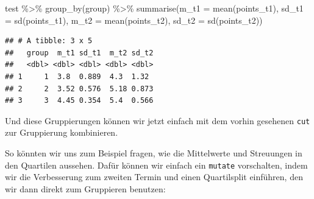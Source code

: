 \documentclass[
]{book}
\newenvironment{Shaded}{\begin{snugshade}}{\end{snugshade}}
\newcommand{\AttributeTok}[1]{\textcolor[rgb]{0.77,0.63,0.00}{#1}}
\newcommand{\FunctionTok}[1]{\textcolor[rgb]{0.00,0.00,0.00}{#1}}
\newcommand{\NormalTok}[1]{#1}
\newcommand{\SpecialCharTok}[1]{\textcolor[rgb]{0.00,0.00,0.00}{#1}}
\begin{document}
\begin{Shaded}
\begin{Highlighting}[]
\NormalTok{test }\SpecialCharTok{\%\textgreater{}\%}
  \FunctionTok{group\_by}\NormalTok{(group) }\SpecialCharTok{\%\textgreater{}\%} 
  \FunctionTok{summarise}\NormalTok{(}\AttributeTok{m\_t1 =} \FunctionTok{mean}\NormalTok{(points\_t1),}
            \AttributeTok{sd\_t1 =} \FunctionTok{sd}\NormalTok{(points\_t1),}
            \AttributeTok{m\_t2 =} \FunctionTok{mean}\NormalTok{(points\_t2),}
            \AttributeTok{sd\_t2 =} \FunctionTok{sd}\NormalTok{(points\_t2))}
\end{Highlighting}
\end{Shaded}

\begin{verbatim}
## # A tibble: 3 x 5
##   group  m_t1 sd_t1  m_t2 sd_t2
##   <dbl> <dbl> <dbl> <dbl> <dbl>
## 1     1  3.8  0.889  4.3  1.32 
## 2     2  3.52 0.576  5.18 0.873
## 3     3  4.45 0.354  5.4  0.566
\end{verbatim}

Und diese Gruppierungen können wir jetzt einfach mit dem vorhin gesehenen \texttt{cut} zur Gruppierung kombinieren.

So könnten wir uns zum Beispiel fragen, wie die Mittelwerte und Streuungen in den Quartilen aussehen. Dafür können wir einfach ein \texttt{mutate} vorschalten, indem wir die Verbesserung zum zweiten Termin und einen Quartilsplit einführen, den wir dann direkt zum Gruppieren benutzen:
\end{document}
